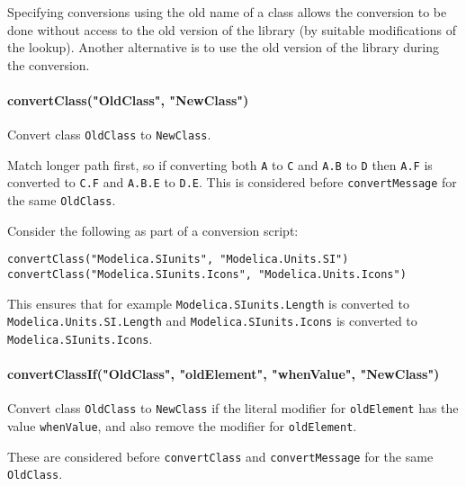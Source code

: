 \begin{nonnormative}
Specifying conversions using the old name of a class allows the conversion to be done without access to the old
version of the library (by suitable modifications of the lookup).  Another alternative is to use the old version
of the library during the conversion.
\end{nonnormative}

\paragraph*{convertClass("OldClass", "NewClass")}\label{convertclassoldclassnewclass}

Convert class \lstinline!OldClass! to \lstinline!NewClass!.

Match longer path first, so if converting both \lstinline!A! to \lstinline!C! and \lstinline!A.B! to \lstinline!D! then \lstinline!A.F! is converted to \lstinline!C.F! and \lstinline!A.B.E! to \lstinline!D.E!. This is considered before \lstinline!convertMessage! for the same \lstinline!OldClass!.

\begin{example}
Consider the following as part of a conversion script:
\begin{lstlisting}[language=modelica]
convertClass("Modelica.SIunits", "Modelica.Units.SI")
convertClass("Modelica.SIunits.Icons", "Modelica.Units.Icons")
\end{lstlisting}
This ensures that for example \lstinline!Modelica.SIunits.Length! is converted to \lstinline!Modelica.Units.SI.Length!
and \lstinline!Modelica.SIunits.Icons! is converted to \lstinline!Modelica.SIunits.Icons!.
\end{example}

\paragraph*{convertClassIf("OldClass", "oldElement", "whenValue", "NewClass")}\label{convertclassifoldclass-oldelement-whenvalue-newclass}

Convert class \lstinline!OldClass! to \lstinline!NewClass! if the literal modifier for
\lstinline!oldElement! has the value \lstinline!whenValue!, and also remove the modifier for
\lstinline!oldElement!.

These are considered before \lstinline!convertClass! and \lstinline!convertMessage! for the same \lstinline!OldClass!.

